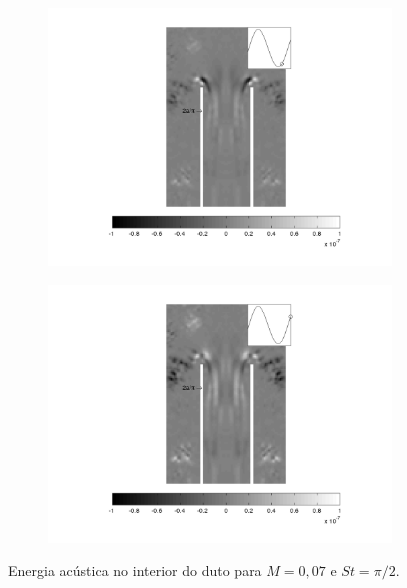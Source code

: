 \begin{landscape}
\begin{figure}[ht!]
\begin{subfigure}{0.55 \textwidth}
  \includegraphics[width=1.\linewidth]{figuras/min_ka_007_5.png}
  \caption[]{}
  \label{fig:min_007_5}
\end{subfigure}
\begin{subfigure}{0.55 \textwidth}
  \includegraphics[width=1.\linewidth]{figuras/min_ka_007_6.png}
  \caption[]{}
  \label{fig:min_007_6}
\end{subfigure}
\caption[Energia acústica para $M = 0,07$ e $St = \pi/2$.]{Energia acústica no interior do duto para $M = 0,07$ e $St = \pi/2$.}\label{fig:min_007}
\end{figure}
\vfill
\clearpage
\end{landscape}



